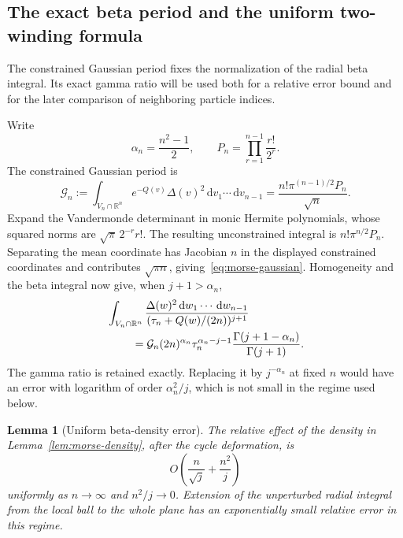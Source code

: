 \documentclass[11pt]{article}
\numberwithin{equation}{section}
\newtheorem{lemma}[theorem]{Lemma}
\theoremstyle{definition}
\newcommand{\R}{\mathbb R}
\newcommand{\dd}{\,\mathrm d}
\begin{document}
\subsection{The exact beta period and the uniform two-winding formula}

The constrained Gaussian period fixes the normalization of the radial
beta integral. Its exact gamma ratio will be used both for a relative
error bound and for the later comparison of neighboring particle indices.

Write
\begin{equation}
 \alpha_n=\frac{n^2-1}{2},\qquad
 P_n=\prod_{r=1}^{n-1}\frac{r!}{2^r}.
 \label{eq:morse-alpha-P}
\end{equation}
The constrained Gaussian period is
\begin{equation}
 \mathcal G_n:=\int_{V_n\cap\R^n}e^{-Q(v)}\Delta(v)^2
                   \dd v_1\cdots\dd v_{n-1}
 =\frac{n!\pi^{(n-1)/2}P_n}{\sqrt n}.
 \label{eq:morse-gaussian}
\end{equation}
Expand the Vandermonde determinant in monic
Hermite polynomials, whose squared norms are
$\sqrt\pi\,2^{-r}r!$.  The resulting unconstrained integral is
$n!\pi^{n/2}P_n$.  Separating the mean coordinate has Jacobian $n$
in the displayed constrained coordinates and contributes
$\sqrt{\pi n}$, giving~\eqref{eq:morse-gaussian}.
Homogeneity and the beta integral now give, when $j+1>\alpha_n$,
\begin{align}
 &\int_{V_n\cap\R^n}
 \frac{\Delta(w)^2\dd w_1\cdots\dd w_{n-1}}
 {(\tau_n+Q(w)/(2n))^{j+1}}\notag\\
 &\hspace{8mm}=
 \mathcal G_n(2n)^{\alpha_n}\tau_n^{\alpha_n-j-1}
 \frac{\Gamma(j+1-\alpha_n)}{\Gamma(j+1)}.
 \label{eq:morse-beta-period}
\end{align}
The gamma ratio is retained exactly.  Replacing it by
$j^{-\alpha_n}$ at fixed $n$ would have an error with logarithm of
order $\alpha_n^2/j$, which is not small in the regime used below.

\begin{lemma}[Uniform beta-density error]
\label{lem:negative-beta-uniform}
The relative effect of the density in
Lemma~\ref{lem:morse-density}, after the cycle deformation, is
\begin{equation}
 O\left(\frac n{\sqrt j}+\frac{n^2}{j}\right)
 \label{eq:morse-beta-relative-error}
\end{equation}
uniformly as $n\to\infty$ and $n^2/j\to0$.  Extension of the
unperturbed radial integral from the local ball to the whole plane
has an exponentially small relative error in this regime.
\end{lemma}
\end{document}

